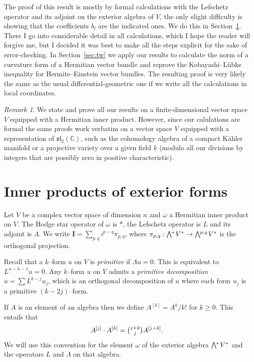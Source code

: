 \documentclass[11pt,a4paper]{amsart}
\def\^#1{^{[#1]}}
\def\bw#1{\bigwedge{}^{\mkern-5mu #1}\mkern2mu}
\def\I{\mathbf{I}}
\def\CC{\mathbb{C}}
\theoremstyle{definition}
\theoremstyle{remark}
\newtheorem*{rema}{Remark}
\numberwithin{equation}{section}
\begin{document}
The proof of this result is mostly by formal calculations with the
Lefschetz operator and its adjoint on the exterior algebra of $V$, the
only slight difficulty is showing that the coefficients $b_l$ are the
indicated ones. We do this in Section~\ref{sec:on}. There I go into
considerable detail in all calculations, which I hope the reader will
forgive me, but I decided it was best to make all the steps explicit for
the sake of error-checking.  In Section~\ref{sec:tw} we apply our results to
calculate the norm of a curvature form of a Hermitian vector bundle and
reprove the Kobayashi--L\"{u}bke inequality for Hermite--Einstein vector
bundles. The resulting proof is very likely the same as the usual
differential-geometric one if we write all the calculations in local
coordinates.

\begin{rema}
We state and prove all our results on a
finite-dimensional vector space $V$ equipped with a Hermitian inner
product. However, since our calulations are formal the same proofs work 
verbatim on a vector space $V$ equipped with a representation of
$\mathfrak{sl}_2(\CC)$, such as the cohomology algebra of a compact
K\"ahler manifold or a projective variety over a given field $k$ (modulo
all our divisions by integers that are possibly zero in positive
characteristic).
\end{rema}





\section{Inner products of exterior forms}
\label{sec:on}



Let $V$ be a complex vector space of dimension $n$ and $\omega$ a Hermitian
inner product on $V$. The Hodge star operator of $\omega$ is $*$,
the Lefschetz operator is $L$ and its adjoint is $\Lambda$. We write
$\I = \sum_{p,q} i^{p-q} \pi_{p,q}$, where $\pi_{p,q} : \bw{*} V^* \to
\bw{p,q} V^*$ is the orthogonal projection.

Recall that a $k$--form $u$ on $V$ is \emph{primitive} if $\Lambda u = 0$.
This is equivalent to $L^{n-k-1}u = 0$. Any $k$--form $u$ on $V$ admits a
\emph{primitive decomposition} $u = \sum L^{k-j} u_j$, which is an
orthogonal decomposition of $u$ where each form $u_j$ is a primitive
$(k-2j)$--form.

If $A$ is an element of an algebra then we define $A\^k = A^k / k!$ for $k
\geq 0$. This entails that
$$
A\^j \cdot A\^k = \tbinom{j+k}{j} A\^{j+k}.
$$
We will use this convention for the element $\omega$ of the exterior
algebra $\bw{*} V^*$ and the operators $L$ and $\Lambda$ on that
algebra.
\end{document}
